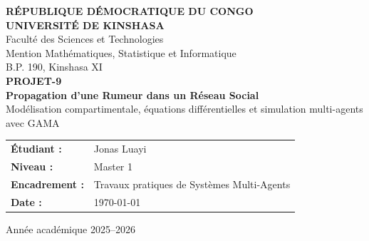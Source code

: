 \documentclass[11pt,a4paper]{article}
\begin{document}
\begin{titlepage}
\begin{center}
  {\bfseries\large RÉPUBLIQUE DÉMOCRATIQUE DU CONGO}\\[4pt]
  {\bfseries\large UNIVERSITÉ DE KINSHASA}\\[8pt]
  {\large Faculté des Sciences et Technologies}\\
  {\large Mention Mathématiques, Statistique et Informatique}\\[8pt]
  {\large B.P. 190, Kinshasa XI}\\[1.5cm]

  {\bfseries\LARGE PROJET-9}\\[6pt]
  {\bfseries\LARGE Propagation d'une Rumeur dans un Réseau Social}\\[8pt]
  {\large Modélisation compartimentale, équations différentielles et simulation multi-agents avec GAMA}\\[1.8cm]

  \begin{tabular}{>{\bfseries}l l}
    Étudiant : & Jonas Luayi \\
    Niveau : & Master 1 \\
    Encadrement : & Travaux pratiques de Systèmes Multi-Agents \\
    Date : & \today \\
  \end{tabular}

  \vfill
  {\large Année académique 2025--2026}
\end{center}
\end{titlepage}
\clearpage
{}

\tableofcontents
\newpage

\begin{abstract}
Ce travail étudie la diffusion d'une rumeur dans un réseau social de type microblogging. À partir d'un modèle agent-based développé dans GAMA, nous construisons une approximation compartimentale décrivant trois états : les ignorants, les croyants et les dénonciateurs. Le modèle met en évidence le rôle du seuil de crédulité, de l'intensité de la rumeur, des influenceurs et d'un agent de fact-checking. Nous formulons un système d'équations différentielles ordinaires correspondant à la dynamique moyenne du phénomène, puis interprétons les résultats issus des simulations GAMA. Les graphes fournis montrent un pic de croyance suivi d'un déclin rapide, avec une montée progressive des dénonciateurs jusqu'à l'extinction de la rumeur. Le rapport présente également le code GAML utilisé et discute les limites de l'approche ainsi que ses prolongements possibles.
\end{abstract}
\end{document}

